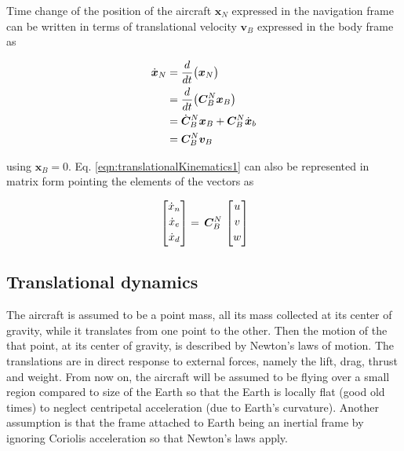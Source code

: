 Time change of the position of the aircraft $\bm{x}_N$ expressed in the navigation frame can be written in terms of translational velocity $\bm{v}_B$ expressed in the body frame as

\begin{align}{\label{eqn:translationalKinematics1}}
\begin{split}
\dot{\bm{x}}_N & = \frac{d}{dt} \big( \bm{x}_N \big) \\
                        & = \frac{d}{dt} \big(\bm{C}_B^N \bm{x}_B \big) \\
                        & = \dot{\bm{C}}_B^N \bm{x}_B + \bm{C}_B^N  \dot{\bm{x}}_b \\
                        & = \bm{C}_B^N \bm{v}_B
\end{split}
\end{align}

using $\bm{x}_B=0$. Eq. \ref{eqn:translationalKinematics1} can also be represented in matrix form pointing the elements of the vectors as

\begin{equation}{\label{eqn:angularMomentumInPrincipleAxes}}
\begin{bmatrix}
\dot{x}_n\\[0.2em]
\dot{x}_e\\[0.2em]
\dot{x}_d\\[0.2em]
\end{bmatrix}
 =\,
\bm{C}_B^N
\,
\begin{bmatrix}
u\\[0.2em]
v\\[0.2em]
w\\[0.2em]
\end{bmatrix}
\end{equation}

\subsection{Translational dynamics}

The aircraft is assumed to be a point mass, all its mass collected at its center of gravity, while it translates from one point to the other.
Then the motion of the that point, at its center of gravity, is described by Newton's laws of motion.
The translations are in direct response to external forces, namely the lift, drag, thrust and weight.
From now on, the aircraft will be assumed to be flying over a small region compared to size of the Earth so that the Earth is locally flat (good old times) to neglect centripetal acceleration (due to Earth's curvature). 
Another assumption is that the frame attached to Earth being an inertial frame by ignoring Coriolis acceleration so that Newton's laws apply. 

